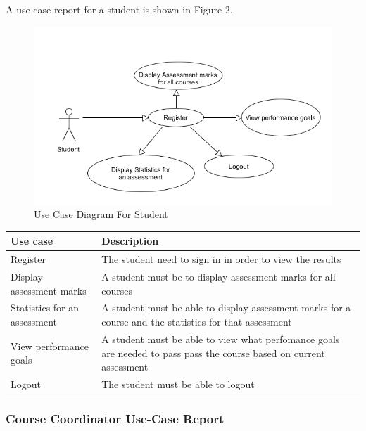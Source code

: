 	A use case report for a student is shown in Figure 2.
	\begin{center}
		\begin{figure}[h]
			\centering
			\includegraphics[trim={0cm 0cm 0cm 0cm },clip,scale = 1.1]{StudentUsecase}
			\caption{Use Case Diagram For Student}
		\end{figure}
	\end{center}
	
	
	
	\begin{center}
		\begin{tabular}{ | p{3cm} | p{10cm}| }
			\hline
			\textbf{Use case}& \textbf{Description} \\ \hline
			Register & The student need to sign in in order to view the results \\ \hline
			Display assessment marks & A student must be to display assessment marks for all courses  \\ \hline
			Statistics for an assessment & A student must be able to display assessment marks for a course and the statistics for that assessment \\ \hline
			View performance goals & A student must be able to view what perfomance goals are needed to pass pass the course based on current assessment \\ \hline
			Logout          & The student must be able to logout  \\ \hline
			
		\end{tabular}
	\end{center}
	\clearpage
	\subsubsection{Course Coordinator Use-Case Report}$\;\;\;\;\;\;\;\;\;\;\;\;\;\;\;\;\;\;\;\;\;\;\;$
	

